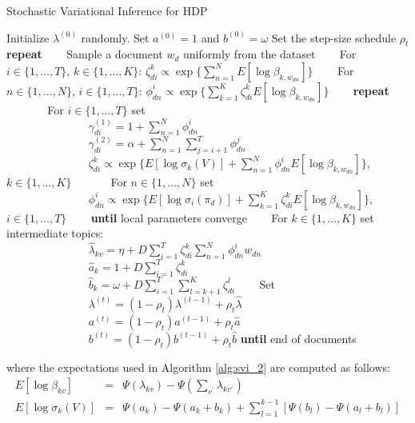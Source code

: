 \begin{algorithm}
\caption{Stochastic Variational Inference for HDP \cite{SVI2013}}
\label{alg:svi_2}
\begin{algorithmic}[1]
\STATE Initialize $\lambda^{(0)}$ randomly. Set $a^{(0)}=1$ and $b^{(0)}=\omega$
\STATE Set the step-size schedule $\rho_t$
\STATE \textbf{repeat}
\STATE ~~~ Sample a document $w_d$ uniformly from the dataset
\STATE ~~~ For $i \in \{1,...,T\}$, $k \in \{1,...,K\}$: $\zeta_{di}^{k} \propto \exp \{\sum_{n=1}^{N}E[\log \beta_{k,w_{dn}}]\}$
\STATE ~~~ For $n \in \{1,...,N\}$, $i \in \{1,...,T \}$: $\phi_{dn}^{i} \propto \exp\{\sum_{k=1}^{K}\zeta_{di}^{k}E[\log\beta_{k,w_{dn}}]\}$
\STATE ~~~ \textbf{repeat}
\STATE ~~~ ~~~ For $i \in \{1,...,T\}$ set \\
~~~ ~~~ ~~~ ~~~ $\gamma_{di}^{(1)} = 1 + \sum_{n=1}^{N}\phi_{dn}^{i}$\\
~~~ ~~~ ~~~ ~~~ $\gamma_{di}^{(2)} = \alpha + \sum_{n=1}^{N}\sum_{j=i+1}^{T}\phi_{dn}^{j}$\\
~~~ ~~~ ~~~ ~~~ $\zeta_{di}^{k} \propto \exp \{E[\log \sigma_k(V)]+\sum_{n=1}^{N}\phi_{dn}^{i}E[\log \beta_{k,w_{dn}}] \}$, $k \in \{1,...,K\}$
\STATE ~~ ~~~ For $n \in \{1,...,N\}$ set \\
~~~ ~~~ ~~~ ~~~ $\phi_{dn}^{i} \propto \exp \{E[\log \sigma_i(\pi_d)]+\sum_{k=1}^{K}\zeta_{di}^{k}E[\log \beta_{k,w_{dn}}] \}$, $i \in \{1,...,T\}$
\STATE ~~~ \textbf{until} local parameters converge
\STATE ~~~ For $k \in \{1,...,K\}$ set intermediate topics:\\
~~~ ~~~ ~~~ ~~~ $\hat{\lambda}_{kv} = \eta + D\sum_{i=1}^{T}\zeta_{di}^{k}\sum_{n=1}^{N}\phi_{dn}^{i}w_{dn}$\\
~~~ ~~~ ~~~ ~~~ $\hat{a}_k = 1 + D\sum_{i=1}^{T} \zeta_{di}^{k}$\\
~~~ ~~~ ~~~ ~~~ $\hat{b}_k = \omega + D\sum_{i=1}^{T}\sum_{l=k+1}^{K}\zeta_{di}^{l}$
\STATE ~~~ Set \\
~~~ ~~~ ~~~ ~~~ $\lambda^{(t)} = (1-\rho_t)\lambda^{(t-1)} + \rho_t\hat{\lambda}$\\
~~~ ~~~ ~~~ ~~~ $a^{(t)} = (1-\rho_t)a^{(t-1)} + \rho_t\hat{a}$\\
~~~ ~~~ ~~~ ~~~ $b^{(t)} = (1-\rho_t)b^{(t-1)} + \rho_t\hat{b}$
\STATE \textbf{until} end of documents
\end{algorithmic}
\end{algorithm}
where the expectations used in Algorithm \ref{alg:svi_2} are computed as follows:
\begin{eqnarray}
    E[\log \beta_{kv}] &=& \Psi(\lambda_{kv}) - \Psi(\sum_{v^{\prime}}\lambda_{kv^{\prime}})\\
    E[\log \sigma_k(V)] &=& \Psi(a_k) - \Psi(a_k+b_k) + \sum_{l=1}^{k-1}[\Psi(b_l)-\Psi(a_l+b_l)]
\end{eqnarray}

